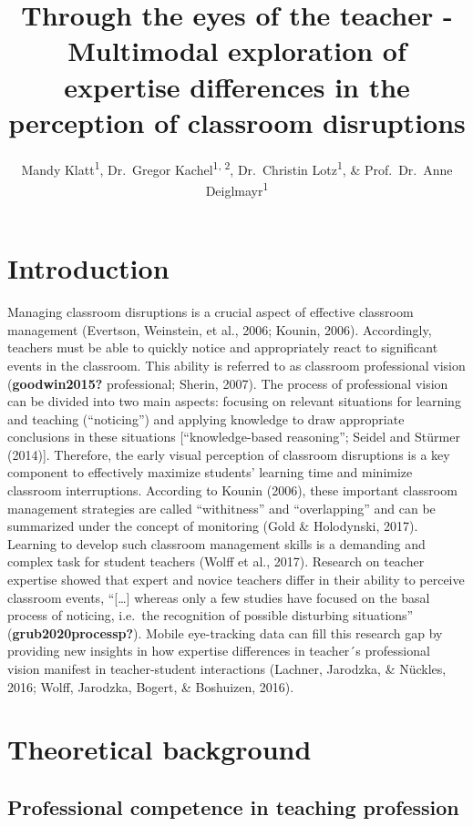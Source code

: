 \documentclass[
  man]{apa6}
\title{Through the eyes of the teacher - Multimodal exploration of expertise differences in the perception of classroom disruptions}
\author{Mandy Klatt\textsuperscript{1}, Dr.~Gregor Kachel\textsuperscript{1, 2}, Dr.~Christin Lotz\textsuperscript{1}, \& Prof.~Dr.~Anne Deiglmayr\textsuperscript{1}}
\date{}
\affiliation{\vspace{0.5cm}\textsuperscript{1} Leipzig University\\\textsuperscript{2} Max Planck Institute for Evolutionary Anthropology}
\begin{document}
\maketitle

\section{Introduction}\label{introduction}

Managing classroom disruptions is a crucial aspect of effective classroom management (Evertson, Weinstein, et al., 2006; Kounin, 2006). Accordingly, teachers must be able to quickly notice and appropriately react to significant events in the classroom. This ability is referred to as classroom professional vision (\textbf{goodwin2015?} professional; Sherin, 2007). The process of professional vision can be divided into two main aspects: focusing on relevant situations for learning and teaching (``noticing'') and applying knowledge to draw appropriate conclusions in these situations {[}``knowledge-based reasoning''; Seidel and Stürmer (2014){]}. Therefore, the early visual perception of classroom disruptions is a key component to effectively maximize students' learning time and minimize classroom interruptions. According to Kounin (2006), these important classroom management strategies are called ``withitness'' and ``overlapping'' and can be summarized under the concept of monitoring (Gold \& Holodynski, 2017). Learning to develop such classroom management skills is a demanding and complex task for student teachers (Wolff et al., 2017). Research on teacher expertise showed that expert and novice teachers differ in their ability to perceive classroom events, ``{[}\ldots{]} whereas only a few studies have focused on the basal process of noticing, i.e.~the recognition of possible disturbing situations'' (\textbf{grub2020processp?}). Mobile eye-tracking data can fill this research gap by providing new insights in how expertise differences in teacher´s professional vision manifest in teacher-student interactions (Lachner, Jarodzka, \& Nückles, 2016; Wolff, Jarodzka, Bogert, \& Boshuizen, 2016).

\section{Theoretical background}\label{theoretical-background}

\subsection{Professional competence in teaching profession}\label{professional-competence-in-teaching-profession}
\end{document}
